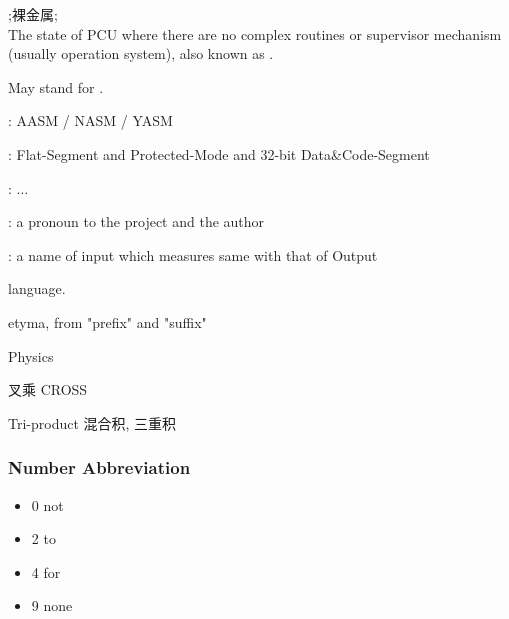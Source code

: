 

;裸金属; \\
The state of PCU where there are no complex routines or supervisor mechanism (usually operation system), also known as .

May stand for .



: AASM / NASM / YASM

: Flat-Segment and Protected-Mode and 32-bit Data\&Code-Segment

: ...

: %
a pronoun to the project and the author

: a name of input which measures same with that of Output

 language. %

 etyma, from "prefix" and "suffix" %

 Physics

 叉乘 CROSS

 Tri-product 混合积, 三重积


\subsubsection{Number Abbreviation}
\begin{itemize}
	\item 0 not
	\item 2 to
	\item 4 for
	\item 9 none
\end{itemize}



